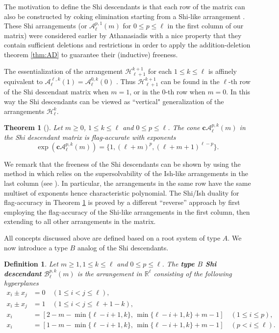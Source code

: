 \documentclass[11pt]{article}
\newtheorem{definition}[theo]{Definition}
\newtheorem{theorem}[theo]{Theorem}
\theoremstyle{definition}
\numberwithin{equation}{section}
\newcommand{\A}{\mathcal{A}}
\newcommand{\Hh}{\mathcal{H}}
\newcommand{\B}{\mathcal{B}}
\newcommand{\cc}{\mathbf{c}}
\begin{document}
The motivation to define the Shi descendants is that each row of the matrix can also be constructed by coking elimination starting from a Shi-like arrangement \cite[Proposition 7.16]{MRT24}. 
These Shi arrangements (or $\A^{p,1}_\ell(m)$ for $0 \le p \le \ell$ in the first column of our matrix) were considered earlier by Athanasiadis \cite[Theorem 3.1]{Atha98} with a nice property that they contain sufficient deletions and restrictions  in order to apply the addition-deletion theorem  \ref{thm:AD} to guarantee their (inductive) freeness. 

The essentialization of the arrangement $\Hh_{\ell+1}^{k+1}$ for each $ 1 \leq k \leq \ell $ is affinely equivalent to $\A^{\ell,k}_\ell (1) = \A^{0,k}_\ell (0)$  \cite[Proposition 2.11]{ATT24}. 
Thus $\Hh_{\ell+1}^{k+1}$ can be found in the $\ell$-th row of the Shi descendant  matrix when $m=1$, or in the $0$-th row when $m=0$. 
In this way the Shi descendants can be viewed as ``vertical" generalization of the arrangements $\Hh_{\ell}^{k}$. 
 
 \begin{theorem}[{\cite[Theorem 7.22]{MRT24}}]
\label{thm:MRT-main1}
Let $m\ge 0$, $1 \le k \le \ell$ and $0 \le p \le \ell$. 
The cone $\cc\A^{p,k}_\ell(m)$ in the Shi descendant matrix is flag-accurate with exponents 
$$\exp(\cc\A^{p,k}_\ell(m)) = \{1, (\ell + m)^{p}, (\ell + m+1)^{\ell-p} \}.$$ 
\end{theorem}

We remark that the freeness of the Shi descendants can be shown by using the method in \cite{ATT24} which relies on the supersolvability of the Ish-like arrangements in the last column (see \cite[Remark 7.19]{MRT24}). 
In particular, the arrangements in the same row have the same multiset of exponents hence characteristic polynomial. 
The Shi/Ish duality for flag-accuracy in Theorem \ref{thm:MRT-main1} is proved by a different ``reverse'' approach by first employing the flag-accuracy of the Shi-like arrangements in the first column, then extending to all other arrangements in the matrix. 

All concepts discussed above are defined based on a root system of type $A$. 
We now introduce a type $B$ analog of the Shi  descendants.
\begin{definition}
\label{def:B-SI}
Let $m\ge 1, 1 \le k \le \ell$ and $0 \le p \le \ell$. 
The   \textbf{type $B$ Shi  descendant} $\B^{p,k}_\ell(m)$ is the arrangement  in $ \mathbb{R}^{\ell} $
consisting of the following hyperplanes
\begin{align*}
x_{i}\pm x_{j} &= 0\quad  (1 \leq i < j \leq \ell), \\
x_{i}\pm x_{j} &= 1 \quad (1 \leq i < j \leq \ell+1-k), \\
x_i&=  [2-m-\min\{\ell-i+1, k\},\,\min\{\ell-i+1, k\}+m-1]  \quad (1 \leq   i \leq p), \\
x_i&=  [1-m-\min\{\ell-i+1, k\},\,\min\{\ell-i+1, k\}+m-1] \quad (p<  i \leq \ell).
\end{align*}
\end{definition}
 
\end{document}
